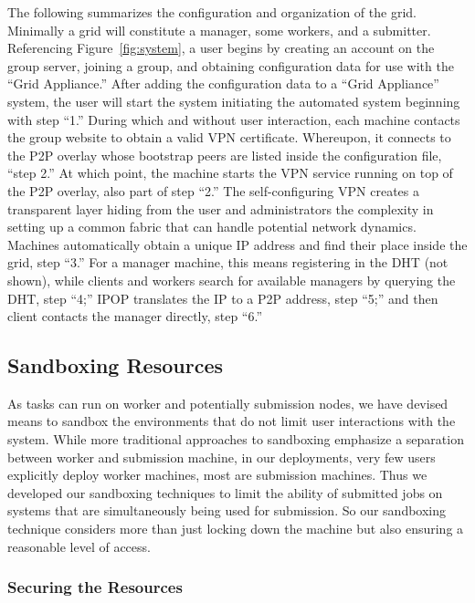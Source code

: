\documentclass[twocolumn]{svjour3}
\begin{document}
The following summarizes the configuration and organization of the grid.
Minimally a grid will constitute a manager, some workers, and a submitter.
Referencing Figure~\ref{fig:system}, a user begins by creating an account on
the group server, joining a group, and obtaining configuration data for use
with the ``Grid Appliance.'' After adding the configuration data to a ``Grid
Appliance'' system, the user will start the system initiating the automated
system beginning with step ``1.'' During which and without user interaction,
each machine contacts the group website to obtain a valid VPN certificate.
Whereupon, it connects to the P2P overlay whose bootstrap peers are listed
inside the configuration file, ``step 2.''  At which point, the machine starts
the VPN service running on top of the P2P overlay, also part of step ``2.'' The
self-configuring VPN creates a transparent layer hiding from the user and
administrators the complexity in setting up a common fabric that can handle
potential network dynamics.  Machines automatically obtain a unique IP address
and find their place inside the grid, step ``3.''  For a manager machine, this
means registering in the DHT (not shown), while clients and workers search for
available managers by querying the DHT, step ``4;'' IPOP translates the IP to a
P2P address, step ``5;'' and then client contacts the manager directly, step
``6.''

\subsection{Sandboxing Resources}

As tasks can run on worker and potentially submission nodes, we have devised
means to sandbox the environments that do not limit user interactions with the
system.  While more traditional approaches to sandboxing emphasize a separation
between worker and submission machine, in our deployments, very few users
explicitly deploy worker machines, most are submission machines.  Thus we
developed our sandboxing techniques to limit the ability of submitted jobs on
systems that are simultaneously being used for submission.  So our sandboxing
technique considers more than just locking down the machine but also ensuring a
reasonable level of access.

\subsubsection{Securing the Resources}
\end{document}
